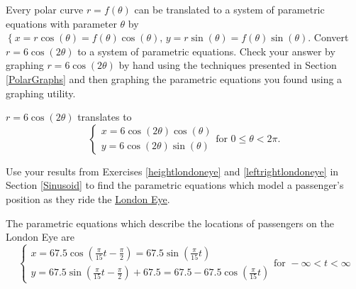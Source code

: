 \documentclass{ximera}
\begin{document}
\begin{problem}
Every polar curve $r = f(\theta)$ can be translated to a system of parametric equations with parameter $\theta$ by $\left\{ x = r\cos(\theta) = f(\theta) \cos(\theta), \, y = r \sin(\theta) = f(\theta) \sin(\theta) \right.$.  Convert $r = 6\cos(2\theta)$ to a system of parametric equations. Check your answer by graphing $r = 6\cos(2\theta)$ by hand using the techniques presented in Section \ref{PolarGraphs} and then graphing the parametric equations you found using a graphing utility.

\begin{solution}
$r = 6\cos(2\theta)$ translates to  \[{ \left\{ \begin{array}{l} x = 6\cos(2\theta)\cos(\theta) \\ y = 6\cos(2\theta)\sin(\theta)  \end{array} \right. \text{for } 0 \leq \theta <  2\pi}.\]
\end{solution}
\end{problem}

\begin{problem} 
Use your results from Exercises \ref{heightlondoneye} and \ref{leftrightlondoneye} in Section \ref{Sinusoid} to find the parametric equations which model a passenger's position as they ride the \href{http://en.wikipedia.org/wiki/London_Eye}{\underline{London Eye}}. 

\begin{solution}
The parametric equations which describe the locations of passengers on the London Eye are \[ \left\{ \begin{array}{l} x = 67.5 \cos\left(\frac{\pi}{15} t - \frac{\pi}{2} \right) = 67.5 \sin\left(\frac{\pi}{15} t \right) \\ y = 67.5 \sin\left(\frac{\pi}{15} t - \frac{\pi}{2} \right) + 67.5 = 67.5 - 67.5 \cos\left(\frac{\pi}{15} t \right)   \end{array} \right. \text{for } -\infty < t < \infty \]
\end{solution}
\end{problem}

\label{projectoilemotion}
\end{document}
